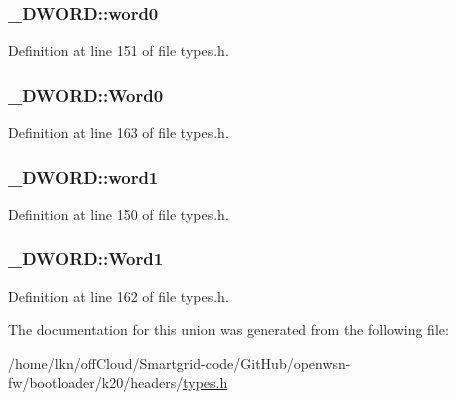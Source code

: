 \subsubsection[{\texorpdfstring{word0}{word0}}]{ \+\_\+\+D\+W\+O\+R\+D\+::word0}\hypertarget{union___d_w_o_r_d_a519a9ce96a9d75931d3e7371a651dc6f}{}\label{union___d_w_o_r_d_a519a9ce96a9d75931d3e7371a651dc6f}


Definition at line 151 of file types.\+h.

\subsubsection[{\texorpdfstring{Word0}{Word0}}]{ \+\_\+\+D\+W\+O\+R\+D\+::\+Word0}\hypertarget{union___d_w_o_r_d_a94323b21e836ab756084129752329a4e}{}\label{union___d_w_o_r_d_a94323b21e836ab756084129752329a4e}


Definition at line 163 of file types.\+h.

\subsubsection[{\texorpdfstring{word1}{word1}}]{ \+\_\+\+D\+W\+O\+R\+D\+::word1}\hypertarget{union___d_w_o_r_d_a389e85e8ecf00275da6b289f3b688abb}{}\label{union___d_w_o_r_d_a389e85e8ecf00275da6b289f3b688abb}


Definition at line 150 of file types.\+h.

\subsubsection[{\texorpdfstring{Word1}{Word1}}]{ \+\_\+\+D\+W\+O\+R\+D\+::\+Word1}\hypertarget{union___d_w_o_r_d_ad8b2ec64b0d9bb77f2441fc54372d4cd}{}\label{union___d_w_o_r_d_ad8b2ec64b0d9bb77f2441fc54372d4cd}


Definition at line 162 of file types.\+h.



The documentation for this union was generated from the following file\+:\begin{DoxyCompactItemize}
\item 
/home/lkn/off\+Cloud/\+Smartgrid-\/code/\+Git\+Hub/openwsn-\/fw/bootloader/k20/headers/\hyperlink{types_8h}{types.\+h}\end{DoxyCompactItemize}
